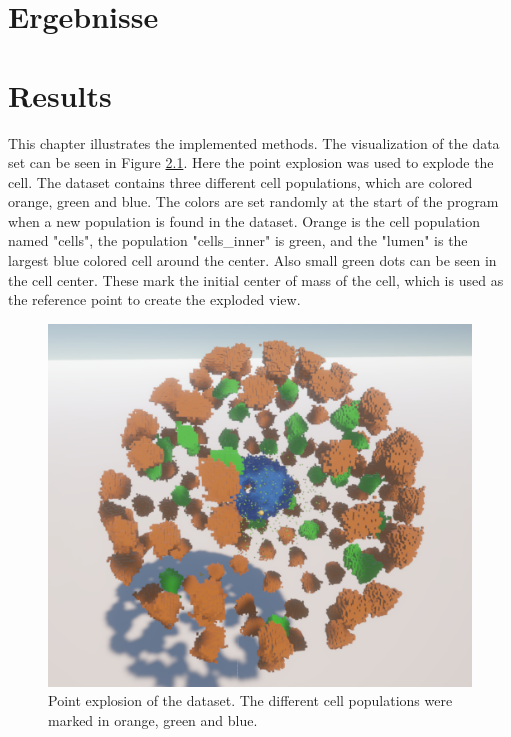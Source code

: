 {\chapter{Ergebnisse}}
{\chapter{Results}}

\label{sec:results}


This chapter illustrates the implemented methods.
The visualization of the data set can be seen in Figure \ref{fig:PointExplosionPicture}. Here the point explosion was used to explode the cell.
The dataset contains three different cell populations, which are colored orange, green and blue. The colors are set randomly at the start of the program when a new population is found in the dataset. Orange is the cell population named "cells", the population "cells\_inner" is green, and the "lumen" is the largest blue colored cell around the center.
Also small green dots can be seen in the cell center. These mark the initial center of mass of the cell, which is used as the reference point to create the exploded view.
\begin{figure}[h]
	\centering
	\includegraphics[width=.6\linewidth]{fig/Images/PointExplosionPicture}
	\caption[]{Point explosion of the dataset. The different cell populations were marked in orange, green and blue. }
	\label{fig:PointExplosionPicture}
\end{figure}

